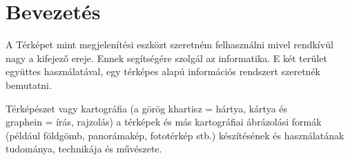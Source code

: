 \makeatletter
\def\thickhrulefill{\leavevmode \leaders \hrule height 1ex \hfill \kern \z@}
\def\@makechapterhead#1{%
  \vspace*{10\p@}%
  {\parindent \z@ \centering \reset@font
        {\Huge \scshape \thechapter}
        \par\nobreak
        \vspace*{15\p@}%
        \interlinepenalty\@M
        \begin{tabular}{@{\qquad}c@{\qquad}}
          \hline
          \\
          {\Huge \bfseries #1\par\nobreak} \\
          \\
          \hline
        \end{tabular}
    \vskip 100\p@
  }}
\def\@makeschapterhead#1{%
  \vspace*{10\p@}%
  {\parindent \z@ \centering \reset@font
        {\Huge \scshape \vphantom{\thechapter}}
        \par\nobreak
        \vspace*{15\p@}%
        \interlinepenalty\@M
        \begin{tabular}{@{\qquad}c@{\qquad}}
          \hline
          \\
          {\Huge \bfseries #1\par\nobreak} \\
          \\
          \hline
        \end{tabular}
    \vskip 100\p@
  }}

\chapter{Bevezetés}

  A Térképet mint megjelenítési eszközt szeretném felhasználni mivel rendkívül nagy a kifejező ereje. Ennek segítségére szolgál az 
informatika. E két terület együttes használatával, egy térképes alapú információs rendszert szeretnék bemutatni.

  Térképészet vagy kartográfia (a görög khartisz = hártya, kártya és \\ graphein = írás, rajzolás)  a térképek és más kartográfiai 
ábrázolási formák (például földgömb, panorámakép, fototérkép stb.) készítésének és használatának tudománya, technikája és művészete.
